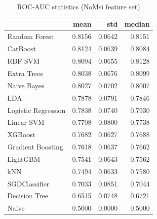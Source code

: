 \begin{table}
\caption{ROC-AUC statistics (NoMsi feature set)}
\label{tab:roc-auc_NoMsi_stats}
\begin{tabular}{lrrr}
\toprule
 & mean & std & median \\
\midrule
Random Forest & 0.8156 & 0.0642 & 0.8151 \\
CatBoost & 0.8124 & 0.0639 & 0.8084 \\
RBF SVM & 0.8094 & 0.0655 & 0.8128 \\
Extra Trees & 0.8038 & 0.0676 & 0.8099 \\
Naive Bayes & 0.8027 & 0.0702 & 0.8007 \\
LDA & 0.7878 & 0.0791 & 0.7846 \\
Logistic Regression & 0.7838 & 0.0740 & 0.7930 \\
Linear SVM & 0.7708 & 0.0800 & 0.7738 \\
XGBoost & 0.7682 & 0.0627 & 0.7688 \\
Gradient Boosting & 0.7618 & 0.0637 & 0.7662 \\
LightGBM & 0.7541 & 0.0643 & 0.7562 \\
kNN & 0.7494 & 0.0633 & 0.7580 \\
SGDClassifier & 0.7033 & 0.0851 & 0.7044 \\
Decision Tree & 0.6515 & 0.0748 & 0.6721 \\
Naive & 0.5000 & 0.0000 & 0.5000 \\
\bottomrule
\end{tabular}
\end{table}
